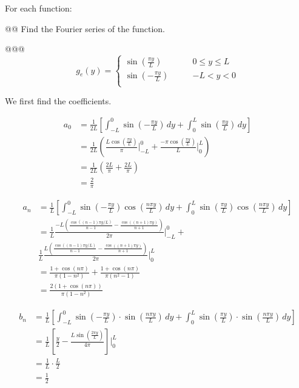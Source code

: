 \documentclass[10pt]{article}
\begin{document}
\begin{easylist}[enumerate]
    For each function:

    @@ Find the Fourier series of the function.

    @@@ \[
        g_e (y) =
            \begin{cases}
                \sin \left( \frac{\pi y}{L} \right) \qquad & 0 \le y \le L\\
                \sin \left( -\frac{\pi y}{L} \right) \qquad & -L < y < 0\\
            \end{cases}
    \]

    We first find the coefficients.

    \begin{align*}
        a_0 &= \frac{1}{2L} \left[ \int_{-L}^0 \sin\left(-\frac{\pi y}{L}\right) \, dy +
                    \int_0^L \sin\left(\frac{\pi y}{L}\right) \, dy \right]\\
        &= \frac{1}{2L} \left( \frac{L \cos\left(\frac{\pi y}{L}\right)}{\pi}\bigg|_{-L}^0 + \frac{-\pi \cos\left(
        \frac{\pi y}{L} \right)}{L} \bigg|_0^L \right)\\
        &= \frac{1}{2L} \left( \frac{2L}{\pi} + \frac{2L}{\pi}  \right)\\
        &= \frac{2}{\pi}
    \end{align*}

    \begin{align*}
        a_n &= \frac{1}{L} \left[ \int_{-L}^0 \sin\left(-\frac{\pi y}{L}\right) \cos\left( \frac{n \pi y}{L} \right) \, dy + \int_0^L \sin\left(\frac{\pi y}{L}\right) \cos\left( \frac{n \pi y}{L} \right) \, dy \right]\\
        &= \frac{1}{L} \frac{-L\left(\frac{\cos((n-1)\pi y / L)}{n-1} - \frac{\cos((n+1)\pi
                        y)}{n+1}\right)}{2\pi}\bigg|_{-L}^0 +\\&\frac{1}{L} \frac{L\left(\frac{\cos((n-1)\pi y / L)}{n-1} - \frac{\cos((n+1)\pi
        y)}{n+1}\right)}{2\pi}\bigg|_0^L\\
        &= \frac{1 + \cos(n \pi)}{\pi(1 - n^2)} + \frac{1 + \cos(n \pi)}{\pi(n^2 - 1)}\\
        &= \frac{2(1 + \cos(n \pi))}{\pi(1 - n^2)}
    \end{align*}

    \begin{align*}
        b_n &= \frac{1}{L}
            \left[ \int_{-L}^0 \sin\left(-\frac{\pi y}{L}\right) \cdot \sin\left( \frac{n \pi y}{L} \right) \, dy + \int_0^L \sin\left(\frac{\pi y}{L}\right) \cdot \sin\left( \frac{n \pi y}{L} \right) \, dy \right]\\
        &= \frac{1}{L} \left[ \frac{y}{2} - \frac{L \sin\left( \frac{2 \pi y}{L} \right)}{4 \pi} \right] \bigg|_0^L\\
        &= \frac{1}{L} \cdot \frac{L}{2}\\
        &= \frac{1}{2}
    \end{align*}


\end{easylist}
\end{document}
